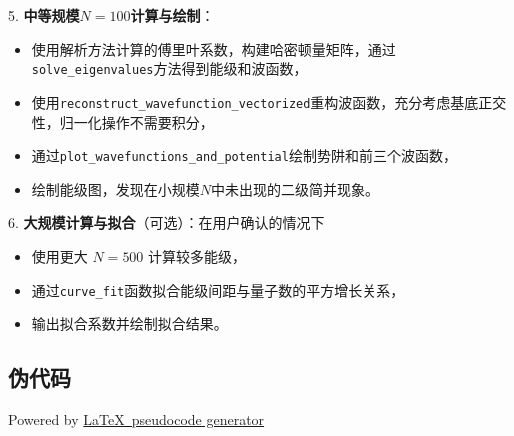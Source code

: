 5. \textbf{中等规模$N=100$计算与绘制}：
   \begin{itemize}
       \item 使用解析方法计算的傅里叶系数，构建哈密顿量矩阵，通过\texttt{solve\_eigenvalues}方法得到能级和波函数，
       \item 使用\texttt{reconstruct\_wavefunction\_vectorized}重构波函数，充分考虑基底正交性，归一化操作不需要积分，
       \item 通过\texttt{plot\_wavefunctions\_and\_potential}绘制势阱和前三个波函数，
       \item 绘制能级图，发现在小规模$N$中未出现的二级简并现象。
   \end{itemize}

6. \textbf{大规模计算与拟合}（可选）：在用户确认的情况下
\begin{itemize}
\item  使用更大 $N=500$ 计算较多能级，
\item 通过\texttt{curve\_fit}函数拟合能级间距与量子数的平方增长关系，
\item 输出拟合系数并绘制拟合结果。
\end{itemize}

\subsection{伪代码}
Powered by \href{https://chatgpt.com/g/g-xJJAA2awf-latex-pseudocode-generator}{\LaTeX \ pseudocode generator}

